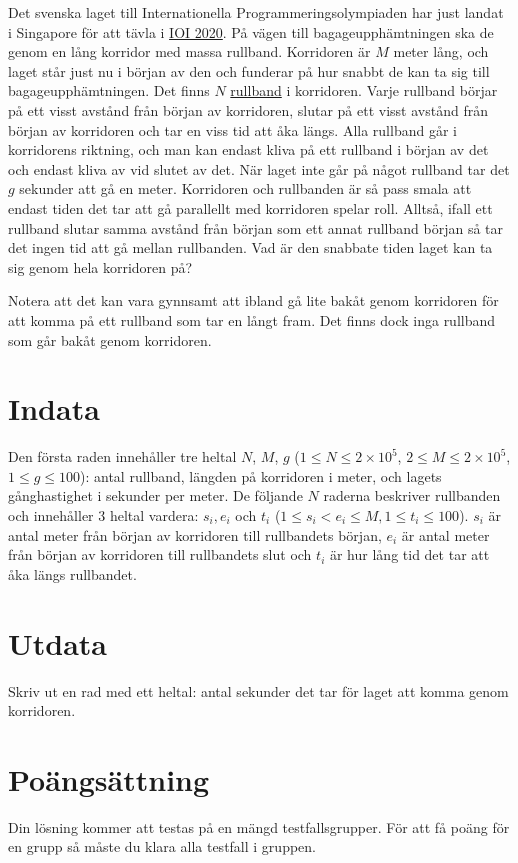 Det svenska laget till Internationella Programmeringsolympiaden har just landat i Singapore för att
tävla i \href{https://ioi2020.sg/}{IOI 2020}.
På vägen till bagageupphämtningen ska de genom en lång korridor med massa rullband.
Korridoren är $M$ meter lång, och laget står just nu i början av den och funderar på
hur snabbt de kan ta sig till bagageupphämtningen.
Det finns $N$ \href{https://sv.wikipedia.org/wiki/Rullande_trottoar}{rullband} i korridoren.
Varje rullband börjar på ett visst avstånd från början av korridoren,
slutar på ett visst avstånd från början av korridoren och tar en viss tid att åka längs.
Alla rullband går i korridorens riktning, och man kan endast kliva på ett rullband i början av det och endast kliva av vid slutet av det.
När laget inte går på något rullband tar det $g$ sekunder att gå en meter.
Korridoren och rullbanden är så pass smala att endast tiden det tar att gå
parallellt med korridoren spelar roll. 
Alltså, ifall ett rullband slutar samma avstånd från början
som ett annat rullband början så tar det ingen tid att gå mellan
rullbanden. Vad är den snabbate tiden laget kan ta sig genom hela korridoren på?

Notera att det kan vara gynnsamt att ibland gå lite bakåt genom korridoren för att komma på
ett rullband som tar en långt fram. Det finns dock inga rullband som går bakåt genom
korridoren.

\section*{Indata}
Den första raden innehåller tre heltal $N$, $M$, $g$ ($1 \le N \le 2\times10^5$, $2 \le M \le 2\times10^5$, $1 \le g \le 100$):
antal rullband, längden på korridoren i meter, och lagets gånghastighet i sekunder per meter.
De följande $N$ raderna beskriver rullbanden och innehåller 3 heltal vardera: $s_i, e_i$ och $t_i$
($1\leq s_i < e_i\leq M,1\leq t_i\leq100$).
$s_i$ är antal meter från början av korridoren till rullbandets början, $e_i$ är antal meter
från början av korridoren till rullbandets slut och $t_i$ är hur lång tid det tar att åka längs rullbandet.

\section*{Utdata}
Skriv ut en rad med ett heltal: antal sekunder det tar för laget att komma genom korridoren.

\section*{Poängsättning}
Din lösning kommer att testas på en mängd testfallsgrupper.
För att få poäng för en grupp så måste du klara alla testfall i gruppen.


